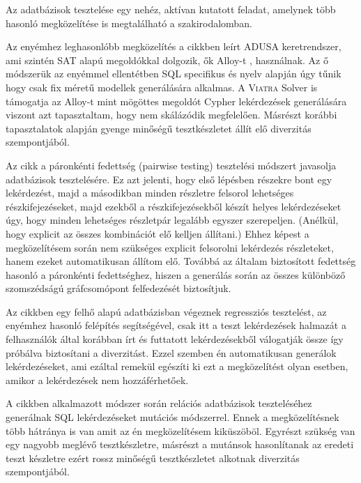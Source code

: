 Az adatbázisok tesztelése egy nehéz, aktívan kutatott feladat, amelynek több hasonló megközelítése is megtalálható a szakirodalomban.


Az enyémhez leghasonlóbb megközelítés a \cite{DBLP:conf} cikkben leírt ADUSA keretrendszer, ami szintén SAT alapú megoldókkal dolgozik, ők Alloy-t \cite{Alloy:Language} , \cite{alloy:kodkod} használnak. Az ő módszerük az enyémmel ellentétben SQL specifikus és nyelv alapján úgy tűnik hogy csak fix méretű modellek generálására alkalmas. A \textsc{Viatra} Solver is támogatja az Alloy-t mint mögöttes megoldót Cypher lekérdezések generálására viszont azt tapasztaltam, hogy nem skálázódik megfelelően. Másrészt korábbi tapasztalatok alapján \cite{semerath2018iterative} gyenge minőségű tesztkészletet állít elő diverzitás szempontjából.


Az \cite{myint2018test} cikk a páronkénti fedettség (pairwise testing) tesztelési módszert javasolja adatbázisok tesztelésére. Ez azt jelenti, hogy első lépésben részekre bont egy lekérdezést, majd a másodikban minden részletre felsorol lehetséges részkifejezéseket, majd ezekből a részkifejezésekből készít helyes lekérdezéseket úgy, hogy minden lehetséges részletpár legalább egyszer szerepeljen. (Anélkül, hogy explicit az összes kombinációt elő kelljen állítani.) Ehhez képest a megközelítésem során nem szükséges explicit felsorolni lekérdezés részleteket, hanem ezeket automatikusan állítom elő. Továbbá az általam biztosított fedettség hasonló a  páronkénti fedettséghez, hiszen a generálás során az összes különböző szomszédságú gráfcsomópont felfedezését biztosítjuk.
	 
 Az \cite{yan2018snowtrail} cikkben egy felhő alapú adatbázisban végeznek regressziós tesztelést, az enyémhez hasonló felépítés segítségével, csak itt a teszt lekérdezések halmazát a felhasználók által korábban írt és futtatott lekérdezésekből válogatják össze így próbálva biztosítani a diverzitást. Ezzel szemben én automatikusan generálok lekérdezéseket, ami ezáltal remekül egészíti ki ezt a megközelítést olyan esetben, amikor a lekérdezések nem hozzáférhetőek. 

A \cite{tuya2006sqlmutation} cikkben alkalmazott módszer során relációs adatbázisok teszteléséhez generálnak SQL lekérdezéseket mutációs módszerrel. Ennek a megközelítésnek több hátránya is van amit az én megközelítésem kiküszöböl. Egyrészt szükség van egy nagyobb meglévő tesztkészletre, másrészt a mutánsok hasonlítanak az eredeti teszt készletre ezért rossz minőségű tesztkészletet alkotnak diverzitás szempontjából. 

